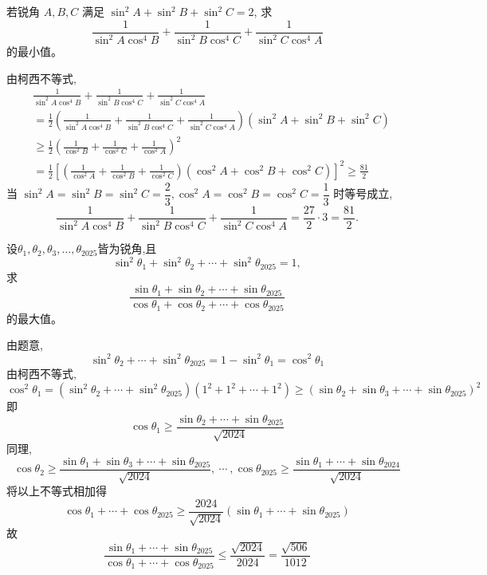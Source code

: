 \begin{questions}
    \question 若锐角 $A,B,C$ 满足 $\sin^2 A + \sin^2 B + \sin^2 C = 2$, 求 
    \[
    \frac{1}{\sin^2 A\cos^4 B} + \frac{1}{\sin^2 B \cos^4 C} + \frac{1}{\sin^2 C \cos^4 A}
    \]
    的最小值。
    \begin{solution}
        由柯西不等式,
        \begin{align*}
        &\frac{1}{\sin^2 A \cos^4 B} + \frac{1}{\sin^2 B \cos^4 C} + \frac{1}{\sin^2 C \cos^4 A} \\
        &= \frac{1}{2} \left( \frac{1}{\sin^2 A \cos^4 B} + \frac{1}{\sin^2 B \cos^4 C} + \frac{1}{\sin^2 C \cos^4 A} \right) (\sin^2 A + \sin^2 B + \sin^2 C) \\
        &\ge \frac{1}{2} \left( \frac{1}{\cos^2 B} + \frac{1}{\cos^2 C} + \frac{1}{\cos^2 A} \right)^2 \\
        &= \frac{1}{2} \left[ \left( \frac{1}{\cos^2 A} + \frac{1}{\cos^2 B} + \frac{1}{\cos^2 C} \right) (\cos^2 A + \cos^2 B + \cos^2 C) \right]^2 \ge \frac{81}{2}
        \end{align*}
        当 $\sin^2 A = \sin^2 B = \sin^2 C = \dfrac{2}{3},\cos^2 A = \cos^2 B = \cos^2 C = \dfrac{1}{3}$ 时等号成立,
        \[
        \frac{1}{\sin^2 A \cos^4 B} + \frac{1}{\sin^2 B \cos^4 C} + \frac{1}{\sin^2 C \cos^4 A} = \frac{27}{2} \cdot 3 = \frac{81}{2}.
        \]
    \end{solution}

    \question 设$\theta_1, \theta_2, \theta_3, \dots, \theta_{2025}$皆为锐角,且
    \[
    \sin^2 \theta_1 + \sin^2 \theta_2 + \cdots + \sin^2 \theta_{2025} = 1,
    \]
    求
    \[
    \frac{\sin \theta_1 + \sin \theta_2 + \cdots + \sin \theta_{2025}}{\cos \theta_1 + \cos \theta_2 + \cdots + \cos \theta_{2025}}
    \]
    的最大值。
    \begin{solution}
        由题意,
        \[
        \sin^2 \theta_2 + \cdots + \sin^2 \theta_{2025} = 1-\sin^2 \theta_1  = \cos^2 \theta_1
        \]
        由柯西不等式,
        \[
        \cos^2 \theta_1 = (\sin^2 \theta_2 + \cdots + \sin^2 \theta_{2025})(1^2 + 1^2 + \cdots + 1^2)
        \ge (\sin \theta_2 + \sin \theta_3 + \cdots + \sin \theta_{2025})^2
        \]
        即
        \[
        \cos \theta_1 \ge \frac{\sin \theta_2 + \cdots + \sin \theta_{2025}}{\sqrt{2024}}
        \]
        同理,
        \[
        \cos \theta_2 \ge \frac{\sin \theta_1 + \sin \theta_3 + \cdots + \sin \theta_{2025}}{\sqrt{2024}}, \ \cdots \ , \cos \theta_{2025} \ge \frac{\sin \theta_1 + \cdots + \sin \theta_{2024}}{\sqrt{2024}}
        \]
        将以上不等式相加得
        \[
        \cos \theta_1 + \cdots + \cos \theta_{2025} \ge \frac{2024}{\sqrt{2024}} (\sin \theta_1 + \cdots + \sin \theta_{2025})
        \]
        故
        \[
        \frac{\sin \theta_1 + \cdots + \sin \theta_{2025}}{\cos \theta_1 + \cdots + \cos \theta_{2025}} \le \frac{\sqrt{2024}}{2024}
        = \frac{\sqrt{506}}{1012}
        \]
    \end{solution}


\end{questions}
